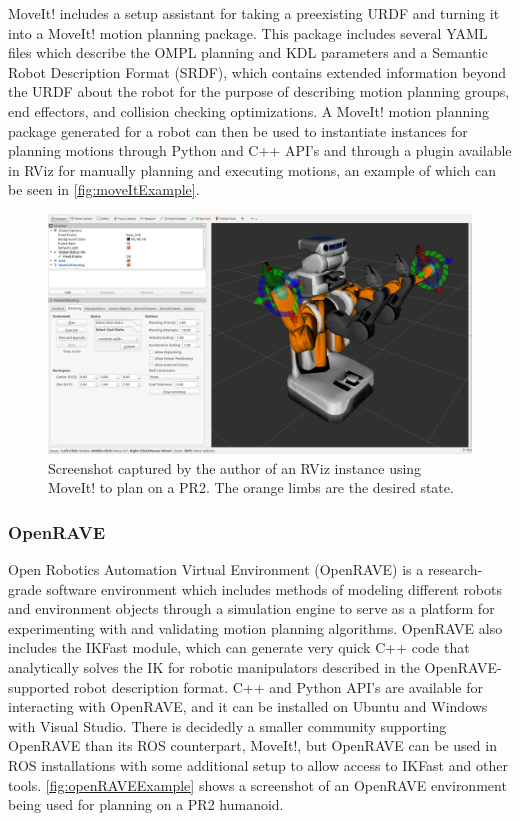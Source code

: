 \documentclass[12pt]{report}
\begin{document}
MoveIt! includes a setup assistant for taking a preexisting URDF and turning it into a MoveIt! motion planning package. This package includes several YAML files which describe the OMPL planning and KDL parameters and a Semantic Robot Description Format (SRDF), which contains extended information beyond the URDF about the robot for the purpose of describing motion planning groups, end effectors, and collision checking optimizations. A MoveIt! motion planning package generated for a robot can then be used to instantiate instances for planning motions through Python and C++ API's and through a plugin available in RViz for manually planning and executing motions, an example of which can be seen in \autoref{fig:moveItExample}.

\begin{figure}[thpb]
	\centering
	\includegraphics[width=\textwidth]{images/moveit_rviz.png}
    \caption{Screenshot captured by the author of an RViz instance using MoveIt! to plan on a PR2. The orange limbs are the desired state.}
    \label{fig:moveItExample}
\end{figure}

\subsubsection{OpenRAVE}
Open Robotics Automation Virtual Environment (OpenRAVE) is a research-grade software environment which includes methods of modeling different robots and environment objects through a simulation engine to serve as a platform for experimenting with and validating motion planning algorithms. \cite{openRave} OpenRAVE also includes the IKFast module, which can generate very quick C++ code that analytically solves the IK for robotic manipulators described in the OpenRAVE-supported robot description format. \cite{ikFast} C++ and Python API's are available for interacting with OpenRAVE, and it can be installed on Ubuntu and Windows with Visual Studio. There is decidedly a smaller community supporting OpenRAVE than its ROS counterpart, MoveIt!, but OpenRAVE can be used in ROS installations with some additional setup to allow access to IKFast and other tools. \autoref{fig:openRAVEExample} shows a screenshot of an OpenRAVE environment being used for planning on a PR2 humanoid.
\end{document}
